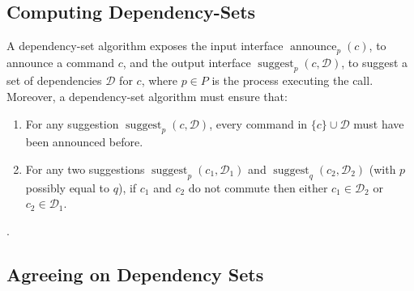 \subsection{Computing Dependency-Sets}
\label{dep-algo}

A dependency-set algorithm exposes the input interface $\operatorname{announce}_p\left( c \right)$, to announce a command $c$, and the output interface $\operatorname{suggest}_p \left( c,\mathcal{D}\right)$, to suggest a set of dependencies $\mathcal{D}$ for $c$, where $p\in P$ is the process executing the call.  
Moreover, a dependency-set algorithm must ensure that:
\begin{enumerate}
    \item For any suggestion $\operatorname{suggest}_p \left( c,\mathcal{D}\right)$, every command in $\{c\}\cup \mathcal{D}$ must have been announced before.
    \item For any two suggestions $\operatorname{suggest}_p \left( c_1,\mathcal{D}_1\right)$ and $\operatorname{suggest}_q \left( c_2,\mathcal{D}_2\right)$ (with $p$ possibly equal to $q$),  if $c_1$ and $c_2$ do not commute then either $c_1\in \mathcal{D}_2$ or $c_2 \in \mathcal{D}_1$.
\end{enumerate}



.

\subsection{Agreeing on Dependency Sets}
\label{map-algo}

